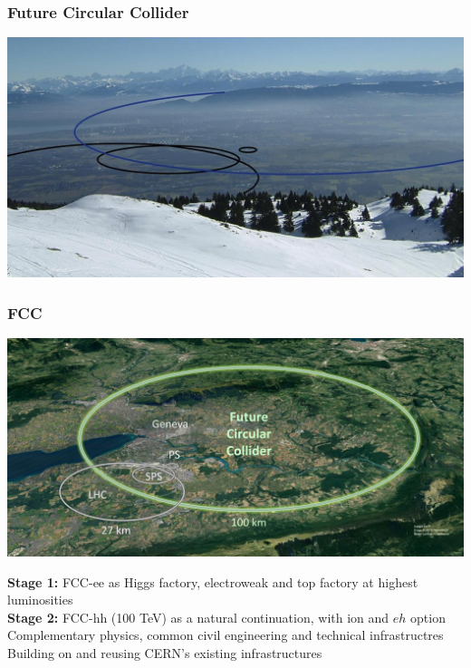 \documentclass[aspectratio=169]{beamer}
\newcommand{\bluetext}[1]{%
  \textcolor{myBlue}{#1}
}
\begin{document}
\begin{frame}
  \frametitle{Future Circular Collider}
  \includegraphics[width=1.0\linewidth]{figures/FCC_landscape.jpg}\\
\end{frame}

\begin{frame}
  \frametitle{FCC}

  \begin{center}
     \includegraphics[width=0.6\linewidth]{figures/CERN-FCC.jpg}\\
  \end{center}

  \bluetext{{\bf Stage 1:} FCC-ee as Higgs factory, electroweak and top factory at highest luminosities}\\
  \bluetext{{\bf Stage 2:} FCC-hh (100 TeV) as a natural continuation, with ion and $eh$ option}\\
Complementary physics, common civil engineering and technical infrastructres\\
Building on and reusing CERN’s existing infrastructures\\

\end{frame}
\end{document}
